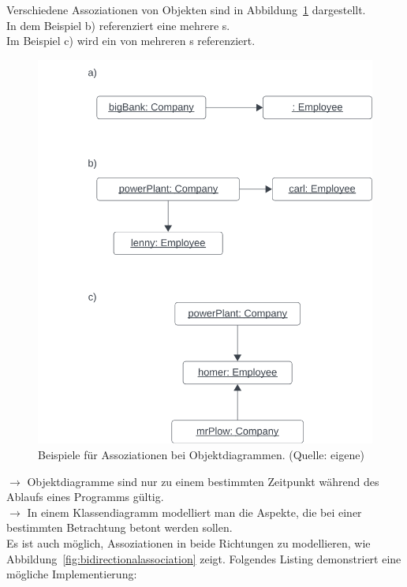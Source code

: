 \noindent
Verschiedene Assoziationen von Objekten sind in Abbildung~\ref{fig:objectassociations} dargestellt.\\
In dem Beispiel b) referenziert eine  mehrere s.\\
Im Beispiel c) wird ein  von mehreren s referenziert.\\

\begin{figure}
    \centering
    \includegraphics[scale=0.5]{chapters/fopt3/img/objectassociations}
    \caption{Beispiele für Assoziationen bei Objektdiagrammen. (Quelle: eigene)}
    \label{fig:objectassociations}
\end{figure}

\noindent
$\rightarrow$ Objektdiagramme sind nur zu einem bestimmten Zeitpunkt während des Ablaufs eines Programms gültig.\\

\noindent
$\rightarrow$ In einem Klassendiagramm modelliert man die Aspekte, die bei einer bestimmten Betrachtung betont werden sollen.\\

\noindent
Es ist auch möglich, Assoziationen in beide Richtungen zu modellieren, wie Abbildung~\ref{fig:bidirectionalassociation} zeigt.
Folgendes Listing demonstriert eine mögliche Implementierung:


